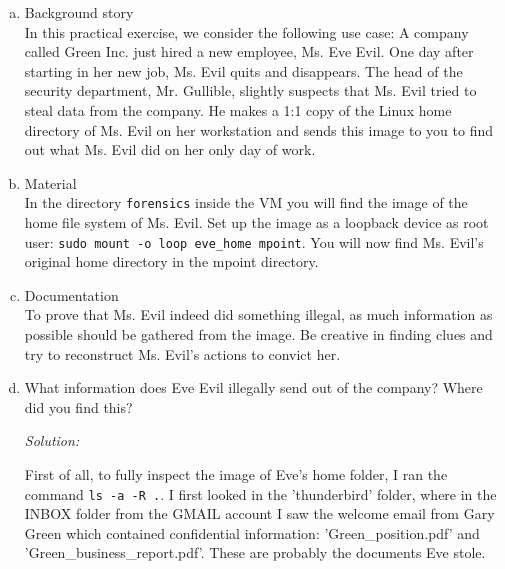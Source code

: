 \documentclass[a4paper,11pt]{article}
\newenvironment{solution}%
{\par{\noindent\small\textit{Solution:}}\vspace{-12pt}\begin{framed}}%
{\end{framed}\par}
\begin{document}
\begin{enumerate}[(a)]

\item Background story\\
  In this practical exercise, we consider the following use case: A
  company called Green Inc. just hired a new employee, Ms. Eve Evil. One
  day after starting in her new job, Ms. Evil quits and
  disappears. The head of the security department, Mr.  Gullible,
  slightly suspects that Ms. Evil tried to steal data from the
  company. He makes a 1:1 copy of the Linux home directory of Ms. Evil
  on her workstation and sends this image to you to find out what
  Ms. Evil did on her only day of work.

\item Material\\
  In the directory \texttt{forensics} inside the VM you will find the image of the
  home file system of Ms. Evil. Set up the image as a
  loopback device as root user: {\tt sudo mount -o loop eve\_home mpoint}.  You
  will now find Ms. Evil's original home directory in the mpoint directory.

\item Documentation\\
  To prove that Ms. Evil indeed did something illegal, as much
  information as possible should be gathered from the image. Be
  creative in finding clues and try to reconstruct Ms. Evil's actions
  to convict her.

\item What information does Eve Evil illegally send out of the company? Where did you find this?
\ifsolution\begin{solution}
First of all, to fully inspect the image of Eve's home folder, I ran the command \texttt{ls -a -R .}.
I first looked in the 'thunderbird' folder, where in the INBOX folder from the GMAIL account
I saw the welcome email from Gary Green which contained confidential information: 'Green\_position.pdf'
and 'Green\_business\_report.pdf'. These are probably the documents Eve stole.
\end{solution} 
\fi


\end{enumerate}
\end{document}
